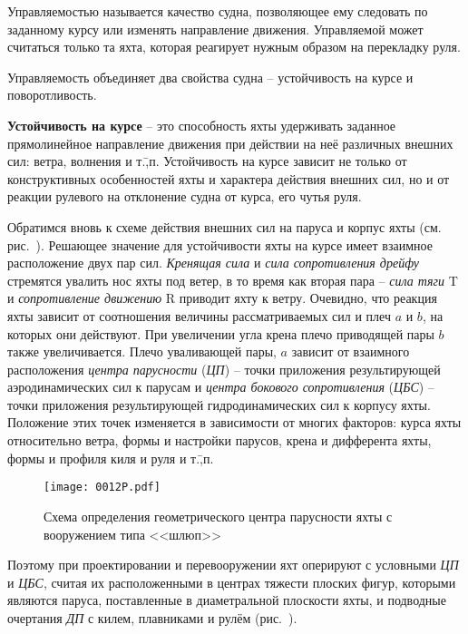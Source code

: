 Управляемостью называется качество судна, позволяющее ему следовать по
заданному курсу или изменять направление движения. Управляемой может
считаться только та яхта, которая реагирует нужным образом на
перекладку руля.

Управляемость объединяет два свойства судна \--- устойчивость на курсе
и поворотливость.

\textbf{Устойчивость на курсе} \--- это
способность яхты удерживать заданное прямолинейное направление
движения при действии на неё различных внешних сил: ветра, волнения и
т.\=,п. Устойчивость на курсе зависит не только от конструктивных
особенностей яхты и характера действия внешних сил, но и от реакции
рулевого на отклонение судна от курса, его чутья руля.

Обратимся вновь к схеме действия внешних сил на паруса и корпус яхты
(см. рис.~). Решающее значение для устойчивости яхты на курсе
имеет взаимное расположение двух пар сил. \textit{Кренящая сила}
 и \textit{сила сопротивления дрейфу}
 стремятся увалить нос
яхты под ветер, в то время как вторая пара \--- \textit{сила тяги} \ve
T и \textit{сопротивление движению} \ve
R приводит яхту к ветру. Очевидно,
что реакция яхты зависит от соотношения величины рассматриваемых сил и
плеч $a$ и $b$, на которых они действуют. При увеличении угла крена
плечо приводящей пары $b$ также увеличивается. Плечо уваливающей пары,
$a$ зависит от взаимного расположения \textit{центра парусности} (\textit{ЦП})
\--- точки приложения результирующей аэродинамических сил к парусам и
\textit{центра бокового сопротивления} (\textit{ЦБС})
\--- точки приложения результирующей гидродинамических сил к корпусу яхты. Положение этих
точек изменяется в зависимости от многих факторов: курса яхты
относительно ветра, формы и настройки парусов, крена и дифферента
яхты, формы и профиля киля и руля и т.\=,п.

\begin{figure}[htb]
  \centering
  \texttt{[image: 0012P.pdf]}
  \caption{Схема определения геометрического центра парусности яхты с вооружением типа <<шлюп>>}
  \label{fig:12}
\end{figure}

Поэтому при проектировании и перевооружении яхт оперируют с условными
\textit{ЦП} и \textit{ЦБС}, считая их расположенными в центрах тяжести
плоских фигур, которыми являются паруса, поставленные в диаметральной
плоскости яхты, и подводные очертания \textit{ДП} с килем, плавниками
и рулём (рис.~).

